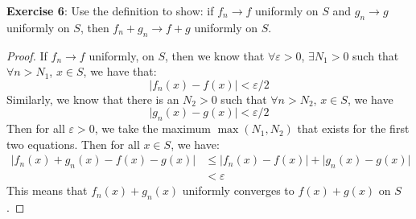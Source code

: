 \documentclass{article}
\begin{document}
\textbf{Exercise 6}: Use the definition to show: if $f_{n} \rightarrow f$ uniformly on $S$ and $g_{n} \rightarrow g$ uniformly on $S$, then $f_{n} + g_{n} \rightarrow f + g$  uniformly on $S$. 
    \begin{proof}
        If $f_{n} \rightarrow f$ uniformly, on $S$, then we know that $\forall \varepsilon > 0$, $\exists N_{1} > 0$ such that $\forall n> N_{1}$, $x \in S$, we have that:
            \begin{equation*}
                \lvert f_{n}(x) - f(x) \rvert < \varepsilon/2
            \end{equation*}
        Similarly, we know that there is an $N_{2} > 0$ such that $\forall n > N_{2}$, $x \in S$, we have
            \begin{equation*}
                \lvert g_{n}(x) - g(x) \rvert < \varepsilon/2
            \end{equation*}
        Then for all $\varepsilon> 0$, we take the maximum $\max(N_{1}, N_{2})$ that exists for the first two equations. Then for all $x \in S$, we have:
            \begin{align*}
                \lvert f_{n}(x) + g_{n}(x) - f(x) - g(x) \rvert & \leq  \lvert f_{n}(x) - f(x) \rvert + \lvert g_{n}(x) - g(x) \rvert \\
                                                                &<      \varepsilon                                                     
            \end{align*}
        This means that $f_{n}(x) + g_{n}(x)$ uniformly converges to $f(x) + g(x)$ on $S$.
    \end{proof}
\end{document}
